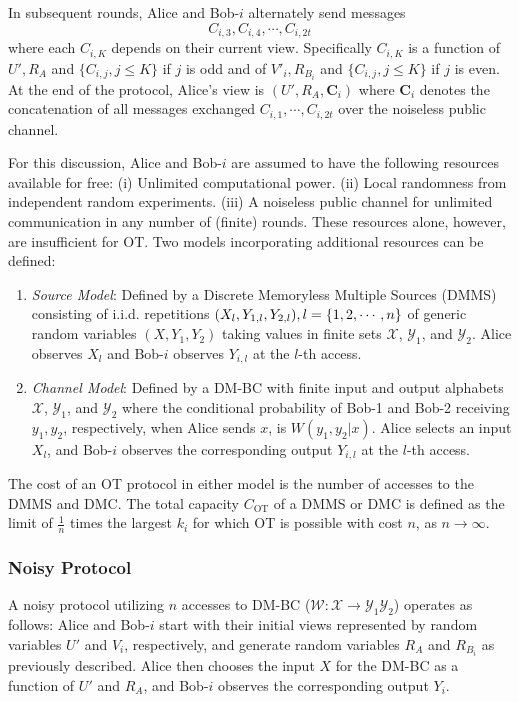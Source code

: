 \documentclass[runningheads]{llncs}
\newcommand{\parbreak}{ \vspace{0.3 em}}
\newcounter{protocol}
\begin{document}
\parbreak In subsequent rounds, Alice and Bob-$i$ alternately send messages \[ C_{i,3}, C_{i,4}, \cdots, C_{i,2t}\] where each $C_{i,K}$ depends on their current view. Specifically $C_{i,K}$ is a function of $U', R_{A}$ and $\{C_{i,j}, j\leq K\}$ if $j$ is odd and of $V'_i, R_{B_i}$ and $\{C_{i,j}, j\leq K\}$ if $j$ is even. At the end of the protocol, Alice's view is $(U', R_{A}, \mathbf{C}_i)$ where $\mathbf{C}_i$ denotes the concatenation of all messages exchanged $C_{i,1}, \cdots, C_{i,2t}$ over the noiseless public channel.

\parbreak For this discussion, Alice and Bob-$i$ are assumed to have the following resources available for free: (i) Unlimited computational power. (ii) Local randomness from independent random experiments. (iii) A noiseless public channel for unlimited communication in any number of (finite) rounds. These resources alone, however, are insufficient for OT. Two models incorporating additional resources can be defined:

\begin{enumerate}
    \item \emph{Source Model}: Defined by a Discrete Memoryless Multiple Sources (DMMS) consisting of i.i.d. repetitions $(X_{l}, Y_{1,l}, Y_{2,l}),\\ l = \{1, 2, \cdots, n\}$ of generic random variables $(X, Y_1, Y_2)$ taking values in finite sets $\mathcal{X}$, $\mathcal{Y}_1$, and $\mathcal{Y}_2$. Alice observes $X_{l}$ and Bob-$i$ observes $Y_{i,l}$ at the $l$-th access.
    \item \emph{Channel Model}: Defined by a DM-BC with finite input and output alphabets $\mathcal{X}$, $\mathcal{Y}_1$, and $\mathcal{Y}_2$ where the conditional probability of Bob-1 and Bob-2 receiving $y_1, y_2$, respectively, when Alice sends $x$, is $W(y_1,y_2|x)$. Alice selects an input $X_{l}$, and Bob-$i$ observes the corresponding output $Y_{i,l}$ at the $l$-th access.
\end{enumerate}

\parbreak The cost of an OT protocol in either model is the number of accesses to the DMMS and DMC. The total capacity $C_{\text{OT}}$ of a DMMS or DMC is defined as the limit of $\frac{1}{n}$ times the largest $k_i$ for which OT is possible with cost $n$, as $n\rightarrow \infty$. 

\subsubsection{Noisy Protocol}\label{noisy protocol:BC}
    \parbreak A noisy protocol utilizing $n$ accesses to DM-BC ($\mathcal{W}: \mathcal{X}\rightarrow \mathcal{Y}_1\mathcal{Y}_2$) operates as follows: Alice and Bob-$i$ start with their initial views represented by random variables $U'$ and $V_i$, respectively, and generate random variables $R_{A}$ and $R_{B_i}$ as previously described. Alice then chooses the input $X$ for the DM-BC as a function of $U'$ and $R_{A}$, and Bob-$i$ observes the corresponding output $Y_i$. 
\end{document}
